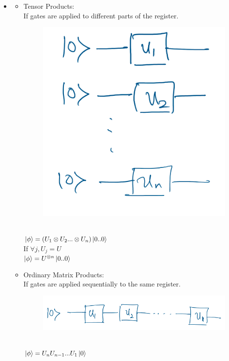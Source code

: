 \documentclass[11.5pt, paper=a4]{article}
\theoremstyle{definition}
\numberwithin{theorem}{section}
\begin{document}
\begin{itemize}
    \item
        \begin{itemize}
            \item Tensor Products: \\
                If gates are applied to different parts of the register.
                \begin{figure}[h]
                    \centering
                    \includegraphics[scale=0.2]{Tensor Product.png}
                \end{figure}\\
                $\ket{\phi} = (U_{1}\otimes U_{2}...\otimes U_{n})\ket{0..0}$\\
                If $\forall j, U_{j}=U$\\
                $\ket{\phi} =   U^{\otimes n}\ket{0..0}$
            \item Ordinary Matrix Products: \\
                If gates are applied sequentially to the same register.
                \begin{figure}[h]
                    \centering
                    \includegraphics[scale=0.2]{Tensor Product2.png}
                \end{figure}\\
                $\ket{\phi}=U_{n} U_{n-1} ... U_{1}\ket{0}$
        \end{itemize}


\end{itemize}
\end{document}
